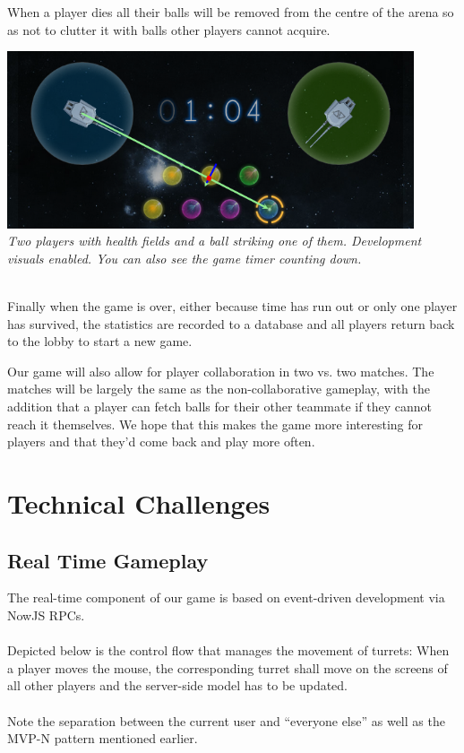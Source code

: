\documentclass[a4wide, 11pt]{article}
\begin{document}
When a player dies all their balls will be removed from the centre of the arena so as not to clutter it with balls other players cannot acquire.

\begin{center}

    \includegraphics[width=0.9\textwidth]{images/shoot_collision.png} \\
  \emph{Two players with health fields and a ball striking one of them. Development visuals enabled.
You can also see the game timer counting down.}
\end{center}
\ \\
Finally when the game is over, either because time has run out or only one player has survived, the statistics are recorded to a database and all players return back to the lobby to start a new game.

Our game will also allow for player collaboration in two vs. two matches. The matches will be largely the same as the non-collaborative gameplay, with the addition that a player can fetch balls for their other teammate if they cannot reach it themselves. We hope that this makes the game more interesting for players and that they'd come back and play more often.

\section{Technical Challenges}
\subsection{Real Time Gameplay}
The real-time component of our game is based on event-driven development via NowJS RPCs.
\\ \\
Depicted below is the control flow that manages the movement of turrets: When a player moves the mouse, the corresponding turret shall move on the screens of all other players and the server-side model has to be updated.
\\ \\
Note the separation between the current user and “everyone else” as well as the MVP-N pattern mentioned earlier.
\end{document}
